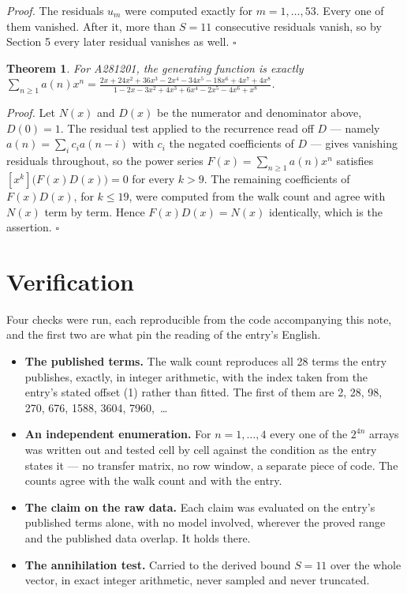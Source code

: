 \documentclass[11pt]{article}
\newtheorem{theorem}{Theorem}
\theoremstyle{definition}
\begin{document}
{\itshape Proof.} The residuals $u_m$ were computed exactly for $m = 1,\dots,53$. Every one of them vanished. After it, more than $S = 11$ consecutive residuals vanish, so by Section 5 every later residual vanishes as well. $\square$

\begin{theorem} For A281201, the generating function is exactly $\sum_{n\ge 1} a(n)x^n = \frac{2x + 24x^{2} + 36x^{3} - 2x^{4} - 34x^{5} - 18x^{6} + 4x^{7} + 4x^{8}}{1 - 2x - 3x^{2} + 4x^{3} + 6x^{4} - 2x^{5} - 4x^{6} + x^{8}}$.\end{theorem}

{\itshape Proof.} Let $N(x)$ and $D(x)$ be the numerator and denominator above, $D(0)=1$. The residual test applied to the recurrence read off $D$ --- namely $a(n) = \sum_i c_i a(n-i)$ with $c_i$ the negated coefficients of $D$ --- gives vanishing residuals throughout, so the power series $F(x)=\sum_{n\ge 1}a(n)x^n$ satisfies $[x^k]\bigl(F(x)D(x)\bigr) = 0$ for every $k > 9$. The remaining coefficients of $F(x)D(x)$, for $k \le 19$, were computed from the walk count and agree with $N(x)$ term by term. Hence $F(x)D(x) = N(x)$ identically, which is the assertion. $\square$

\section{Verification}

Four checks were run, each reproducible from the code accompanying this note, and the first two are what pin the reading of the entry's English.

\begin{itemize}

\item {\bfseries The published terms.} The walk count reproduces all 28 terms the entry publishes, exactly, in integer arithmetic, with the index taken from the entry's stated offset (1) rather than fitted. The first of them are 2, 28, 98, 270, 676, 1588, 3604, 7960,~\dots

\item {\bfseries An independent enumeration.} For $n = 1,\dots,4$ every one of the $2^{4n}$ arrays was written out and tested cell by cell against the condition as the entry states it --- no transfer matrix, no row window, a separate piece of code. The counts agree with the walk count and with the entry.

\item {\bfseries The claim on the raw data.} Each claim was evaluated on the entry's published terms alone, with no model involved, wherever the proved range and the published data overlap. It holds there.

\item {\bfseries The annihilation test.} Carried to the derived bound $S = 11$ over the whole vector, in exact integer arithmetic, never sampled and never truncated.

\end{itemize}
\end{document}
